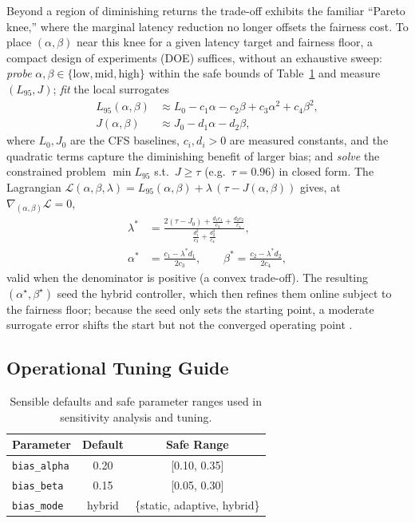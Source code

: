 Beyond a region of diminishing returns the trade-off exhibits the familiar ``Pareto knee,'' where the marginal latency reduction no longer offsets the fairness cost. To place $(\alpha,\beta)$ near this knee for a given latency target and fairness floor, a compact design of experiments (DOE) suffices, without an exhaustive sweep: \emph{probe} $\alpha,\beta\in\{\text{low},\text{mid},\text{high}\}$ within the safe bounds of Table~\ref{tab:defaults} and measure $(L_{95},J)$; \emph{fit} the local surrogates
\begin{align}
L_{95}(\alpha,\beta) &\approx L_0 - c_1 \alpha - c_2 \beta + c_3 \alpha^2 + c_4 \beta^2, \\
J(\alpha,\beta) &\approx J_0 - d_1 \alpha - d_2 \beta,
\end{align}
where $L_0,J_0$ are the CFS baselines, $c_i,d_i>0$ are measured constants, and the quadratic terms capture the diminishing benefit of larger bias; and \emph{solve} the constrained problem $\min L_{95}$ s.t.\ $J\ge\tau$ (e.g.\ $\tau=0.96$) in closed form. The Lagrangian $\mathcal{L}(\alpha,\beta,\lambda)=L_{95}(\alpha,\beta)+\lambda\,(\tau-J(\alpha,\beta))$ gives, at $\nabla_{(\alpha,\beta)}\mathcal{L}=0$,
\begin{equation}
\label{eq:alpha_beta_opt}
\begin{split}
\lambda^* &= 
\frac{2(\tau - J_0) + \frac{d_1 c_1}{c_3} + \frac{d_2 c_2}{c_4}}
{\frac{d_1^2}{c_3} + \frac{d_2^2}{c_4}}, \\
\alpha^* &= \frac{c_1 - \lambda^* d_1}{2c_3}, \qquad
\beta^*  = \frac{c_2 - \lambda^* d_2}{2c_4},
\end{split}
\end{equation}
valid when the denominator is positive (a convex trade-off). The resulting $(\alpha^\star,\beta^\star)$ seed the hybrid controller, which then refines them online subject to the fairness floor; because the seed only sets the starting point, a moderate surrogate error shifts the start but not the converged operating point \cite{10306992}.

\subsection{Operational Tuning Guide}
\label{subsec:tuning_guide}

\begin{table}[t]
\centering
\caption{Sensible defaults and safe parameter ranges used in sensitivity analysis and tuning.}
\label{tab:defaults}
\begin{tabular}{lcc}
\toprule
Parameter & Default & Safe Range \\
\midrule
\texttt{bias\_alpha} & 0.20 & [0.10, 0.35] \\
\texttt{bias\_beta}  & 0.15 & [0.05, 0.30] \\
\texttt{bias\_mode}  & hybrid & \{static, adaptive, hybrid\} \\
\bottomrule
\end{tabular}
\end{table}

